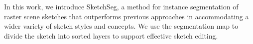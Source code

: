 In this work, we introduce SketchSeg, a method for instance segmentation of raster scene sketches that outperforms previous approaches in accommodating a wider variety of sketch styles and concepts. 
We use the segmentation map to divide the sketch into sorted layers to support effective sketch editing.

